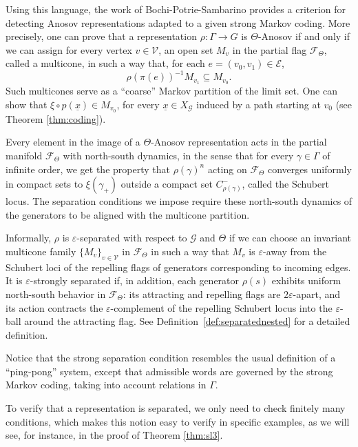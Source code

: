 \documentclass{amsart}
\theoremstyle{remark}
\theoremstyle{definition}
\begin{document}
Using this language, the work of Bochi-Potrie-Sambarino \cite{bochi2019anosov} provides a criterion for detecting Anosov representations adapted to a given strong Markov coding. 
More precisely, one can prove that a representation $\rho: \Gamma \rightarrow G$ is $\Theta$-Anosov if and only if we can assign for every vertex $v \in \mathcal{V}$, an open set $M_v$ in the partial flag $\mathcal{F}_\Theta$, called a multicone, in such a way that, for each $e = (v_0, v_1) \in \mathcal{E}$,
$$\rho(\pi(e))^{-1}M_{v_1} \subseteq M_{v_0}.$$
Such multicones serve as a ``coarse'' Markov partition of the limit set.
One can show that $\xi \circ p (\underline{x}) \in M_{v_0}$, for every $\underline{x} \in X_\mathcal{G}$ induced by a path starting at $v_0$ (see Theorem \ref{thm:coding}).

Every element in the image of a $\Theta$-Anosov representation acts in the partial manifold $\mathcal{F}_\Theta$ with north-south dynamics, in the sense that for every $\gamma \in \Gamma$ of infinite order, we get the property that $\rho (\gamma)^n$ acting on $\mathcal{F}_\Theta$ converges uniformly in compact sets to $\xi (\gamma_+)$ outside a compact set $C_{\rho (\gamma)}^-$, called the Schubert locus.
The separation conditions we impose require these north-south dynamics of the generators to be aligned with the multicone partition.

Informally, $\rho$ is $\varepsilon$-separated with respect to $\mathcal{G}$ and $\Theta$ if we can choose an invariant multicone family $\{M_v\}_{v \in \mathcal{V}}$ in $\mathcal{F}_\Theta$ in such a way that $M_v$ is $\varepsilon$-away from the Schubert loci of the repelling flags of generators corresponding to incoming edges. It is $\varepsilon$-strongly separated if, in addition, each generator $\rho(s)$ exhibits uniform north-south behavior in $\mathcal{F}_\Theta$: its attracting and repelling flags are $2\varepsilon$-apart, and its action contracts the $\varepsilon$-complement of the repelling Schubert locus into the $\varepsilon$-ball around the attracting flag. See Definition~\ref{def:separatednested} for a detailed definition.


Notice that the strong separation condition resembles the usual definition of a ``ping-pong'' system, except that admissible words are governed by the strong Markov coding, taking into account relations in $\Gamma$.

To verify that a representation is separated, we only need to check finitely many conditions, which makes this notion easy to verify in specific examples, as we will see, for instance, in the proof of Theorem \ref{thm:sl3}.
\end{document}
